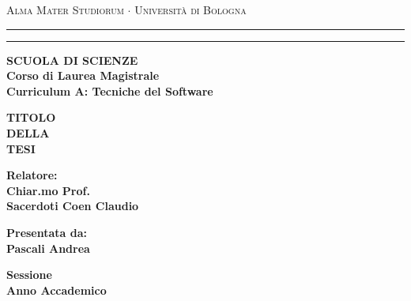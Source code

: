 \documentclass[12pt,a4paper]{report}
\begin{document}
\begin{titlepage}
\begin{center}
{{\Large{\textsc{Alma Mater Studiorum $\cdot$ Universit\`a di
Bologna}}}} \rule[0.1cm]{15.8cm}{0.1mm}
\rule[0.5cm]{15.8cm}{0.6mm}
{\small{\bf SCUOLA DI SCIENZE\\
Corso di Laurea Magistrale \\Curriculum A: Tecniche del Software }}
\end{center}
\vspace{15mm}
\begin{center}
{\LARGE{\bf TITOLO}}\\
\vspace{3mm}
{\LARGE{\bf DELLA}}\\
\vspace{3mm}
{\LARGE{\bf TESI}}\\
\end{center}
\vspace{40mm}
\par
\noindent
\begin{minipage}[t]{0.47\textwidth}
{\large{\bf Relatore:\\
Chiar.mo Prof.\\
Sacerdoti Coen Claudio}}
\end{minipage}
\hfill
\begin{minipage}[t]{0.47\textwidth}\raggedleft
{\large{\bf Presentata da:\\
Pascali Andrea}}
\end{minipage}
\vspace{20mm}
\begin{center}
{\large{\bf Sessione\\%
Anno Accademico }}%
\end{center}
\end{titlepage}
\end{document}
